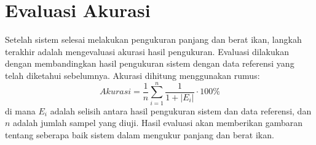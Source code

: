 \section{Evaluasi Akurasi}
    Setelah sistem selesai melakukan pengukuran panjang dan berat ikan, langkah terakhir adalah mengevaluasi akurasi hasil pengukuran. Evaluasi dilakukan dengan membandingkan hasil pengukuran sistem dengan data referensi yang telah diketahui sebelumnya. 
    Akurasi dihitung menggunakan rumus:
\begin{equation}
    Akurasi = \frac{1}{n} \sum_{i=1}^{n} \frac{1}{1 + |E_i|} \cdot 100\%
\end{equation}
    di mana \(E_i\) adalah selisih antara hasil pengukuran sistem dan data referensi, dan \(n\) adalah jumlah sampel yang diuji. Hasil evaluasi akan memberikan gambaran tentang seberapa baik sistem dalam mengukur panjang dan berat ikan.